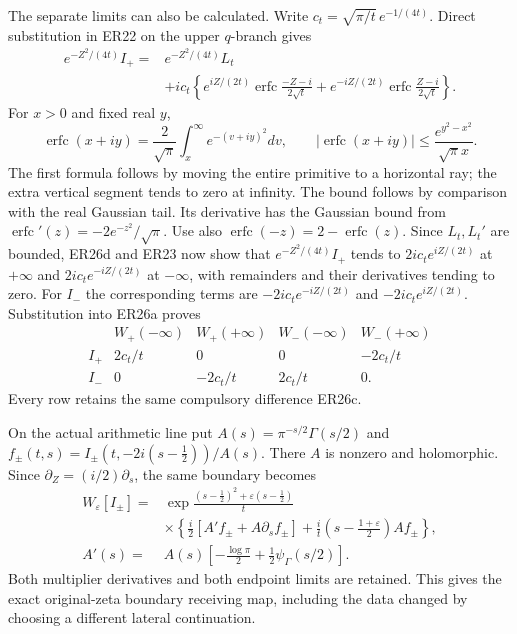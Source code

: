 The separate limits can also be calculated. Write
\(c_t=\sqrt{\pi/t}\,e^{-1/(4t)}\). Direct substitution
in ER22 on the upper \(q\)-branch gives
\[
 \begin{split}
 e^{-Z^2/(4t)}I_+
 ={}&e^{-Z^2/(4t)}L_t\\
 &+ic_t\left\{
 e^{iZ/(2t)}\operatorname{erfc}\frac{-Z-i}{2\sqrt t}
 +e^{-iZ/(2t)}\operatorname{erfc}\frac{Z-i}{2\sqrt t}
 \right\}.
 \end{split}
 \tag{ER26d}
\]
For \(x>0\) and fixed real \(y\),
\[
 \operatorname{erfc}(x+iy)
  =\frac2{\sqrt\pi}\int_x^\infty e^{-(v+iy)^2}dv,\qquad
 |\operatorname{erfc}(x+iy)|
        \le\frac{e^{y^2-x^2}}{\sqrt\pi x}.
\]
The first formula follows by moving the entire primitive to a
horizontal ray; the extra vertical segment tends to zero at infinity.
The bound follows by comparison with the real Gaussian tail.
Its derivative has the Gaussian bound from
\(\operatorname{erfc}'(z)=-2e^{-z^2}/\sqrt\pi\).
Use also \(\operatorname{erfc}(-z)=2-\operatorname{erfc}(z)\).
Since \(L_t,L_t'\) are bounded, ER26d and ER23 now show
that \(e^{-Z^2/(4t)}I_+\) tends to
\(2ic_te^{iZ/(2t)}\) at \(+\infty\) and
\(2ic_te^{-iZ/(2t)}\) at \(-\infty\), with remainders
and their derivatives tending to zero. For \(I_-\) the corresponding
terms are \(-2ic_te^{-iZ/(2t)}\) and
\(-2ic_te^{iZ/(2t)}\). Substitution into ER26a proves
\[
 \begin{array}{c|cc|cc}
 &W_+(-\infty)&W_+(+\infty)&W_-(-\infty)&W_-(+\infty)\\\hline
 I_+&2c_t/t&0&0&-2c_t/t\\
 I_-&0&-2c_t/t&2c_t/t&0 .
 \end{array}
 \tag{ER26e}
\]
Every row retains the same compulsory difference ER26c.

On the actual arithmetic line put \(A(s)=\pi^{-s/2}\Gamma(s/2)\)
and \(f_\pm(t,s)=I_\pm(t,-2i(s-\tfrac12))/A(s)\).
There \(A\) is nonzero and holomorphic. Since
\(\partial_Z=(i/2)\partial_s\), the same boundary becomes
\[
 \begin{split}
 W_\varepsilon[I_\pm]
 ={}&\exp\!\frac{(s-\tfrac12)^2+\varepsilon(s-\tfrac12)}t\\
 &\times\left\{\frac i2[A'f_\pm+A\partial_sf_\pm]
       +\frac it\left(s-\frac{1+\varepsilon}{2}\right)Af_\pm\right\},\\
 A'(s)={}&A(s)\left[-\frac{\log\pi}{2}
                              +\frac12\psi_\Gamma(s/2)\right].
 \end{split}
 \tag{ER26f}
\]
Both multiplier derivatives and both endpoint limits are retained.
This gives the exact original-zeta boundary receiving map, including
the data changed by choosing a different lateral continuation.

